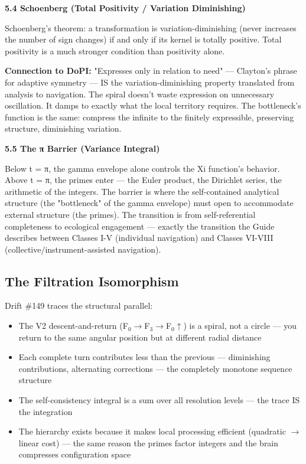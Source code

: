 \textbf{5.4 Schoenberg (Total Positivity / Variation Diminishing)}


Schoenberg's theorem: a transformation is variation-diminishing (never increases the number of sign changes) if and only if its kernel is totally positive. Total positivity is a much stronger condition than positivity alone.


\textbf{Connection to DoPI:} "Expresses only in relation to need" — Clayton's phrase for adaptive symmetry — IS the variation-diminishing property translated from analysis to navigation. The spiral doesn't waste expression on unnecessary oscillation. It damps to exactly what the local territory requires. The bottleneck's function is the same: compress the infinite to the finitely expressible, preserving structure, diminishing variation.


\textbf{5.5 The π Barrier (Variance Integral)}


Below t = π, the gamma envelope alone controls the Xi function's behavior. Above t = π, the primes enter — the Euler product, the Dirichlet series, the arithmetic of the integers. The barrier is where the self-contained analytical structure (the "bottleneck" of the gamma envelope) must open to accommodate external structure (the primes). The transition is from self-referential completeness to ecological engagement — exactly the transition the Guide describes between Classes I-V (individual navigation) and Classes VI-VIII (collective/instrument-assisted navigation).


\subsection*{The Filtration Isomorphism}


Drift \#149 traces the structural parallel:


\begin{itemize}[nosep,leftmargin=*]
  \item The V2 descent-and-return (F$_0$$\rightarrow$F$_3$$\rightarrow$F$_0$$\uparrow$) is a spiral, not a circle — you return to the same angular position but at different radial distance
  \item Each complete turn contributes less than the previous — diminishing contributions, alternating corrections — the completely monotone sequence structure
  \item The self-consistency integral is a sum over all resolution levels — the trace IS the integration
  \item The hierarchy exists because it makes local processing efficient (quadratic $\rightarrow$ linear cost) — the same reason the primes factor integers and the brain compresses configuration space
\end{itemize}



